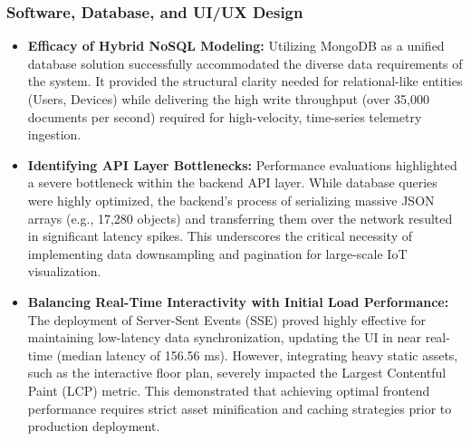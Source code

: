 \subsubsection{Software, Database, and UI/UX Design}
\begin{itemize}
    \item \textbf{Efficacy of Hybrid NoSQL Modeling:} Utilizing MongoDB as a unified database solution successfully accommodated the diverse data requirements of the system. It provided the structural clarity needed for relational-like entities (Users, Devices) while delivering the high write throughput (over 35,000 documents per second) required for high-velocity, time-series telemetry ingestion.
    \item \textbf{Identifying API Layer Bottlenecks:} Performance evaluations highlighted a severe bottleneck within the backend API layer. While database queries were highly optimized, the backend's process of serializing massive JSON arrays (e.g., 17,280 objects) and transferring them over the network resulted in significant latency spikes. This underscores the critical necessity of implementing data downsampling and pagination for large-scale IoT visualization.
    \item \textbf{Balancing Real-Time Interactivity with Initial Load Performance:} The deployment of Server-Sent Events (SSE) proved highly effective for maintaining low-latency data synchronization, updating the UI in near real-time (median latency of 156.56 ms). However, integrating heavy static assets, such as the interactive floor plan, severely impacted the Largest Contentful Paint (LCP) metric. This demonstrated that achieving optimal frontend performance requires strict asset minification and caching strategies prior to production deployment.
\end{itemize}
